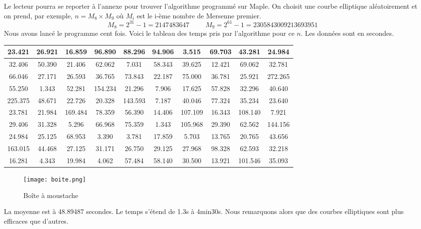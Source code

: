 \documentclass[a4paper]{article}
\begin{document}
\noindent Le lecteur pourra se reporter à l'annexe pour trouver l'algorithme programmé sur Maple.
On choisit une courbe elliptique aléatoirement et on prend, par exemple, $n=M_{8}\times M_{9}$ où $M_{i}$ est le i-ème nombre de Mersenne premier.
\begin{equation*}
M_{8}=2^{31}-1=2 147 483 647 \hspace{1cm} M_{9}=2^{61}-1= 2 305 843 009 213 693 951
\end{equation*}
Nous avons lancé le programme cent fois.
Voici le tableau des temps pris par l'algorithme pour ce $n$.
Les données sont en secondes.
\begin{center}
\begin{tabular}{|*{10}{c|}}
    \hline
     23.421  & 26.921  & 16.859  & 96.890  & 88.296  & 94.906  & 3.515  & 69.703  & 43.281  & 24.984 \\
    \hline
     32.406  & 50.390  & 21.406  & 62.062  & 7.031 & 58.343 & 39.625 & 12.421 & 69.062 & 32.781 \\
    \hline
     66.046  & 27.171  & 26.593  & 36.765 & 73.843 & 22.187 & 75.000 & 36.781 & 25.921 & 272.265 \\
    \hline
     55.250  & 1.343  & 52.281 & 154.234 & 21.296 & 7.906 & 17.625 & 57.828 & 32.296 & 40.640 \\
    \hline
     225.375  & 48.671 & 22.726 & 20.328 & 143.593 & 7.187 & 40.046 & 77.324 & 35.234 & 23.640 \\
    \hline
     23.781  & 21.984 & 169.484 & 78.359 & 56.390 & 14.406 & 107.109 & 16.343 & 108.140 & 7.921 \\
    \hline
     29.406  & 31.328 & 5.296 & 66.968 & 75.359 & 1.343 & 105.968 & 29.390 & 62.562 & 144.156 \\
    \hline
     24.984  & 25.125 & 68.953 & 3.390 & 3.781 & 17.859 & 5.703 & 13.765 & 20.765 & 43.656 \\
    \hline
     163.015  & 44.468 & 27.125 & 31.171 & 26.750 & 29.125 & 27.968 & 98.328 & 62.593 & 32.218 \\
    \hline
    16.281  & 4.343 & 19.984 & 4.062 & 57.484 & 58.140 & 30.500 & 13.921 & 101.546 & 35.093 \\
   \hline
\end{tabular}
\end{center}
\begin{figure}[h]
\centering
\texttt{[image: boite.png]}
\caption{Boîte à moustache}
\label{neutre}
\end{figure} 
\noindent La moyenne est à 48.89487 secondes. Le temps s'étend de 1.3s à 4min30s. Nous remarquons alors que des courbes elliptiques sont plus efficaces que d'autres. 
\end{document}
